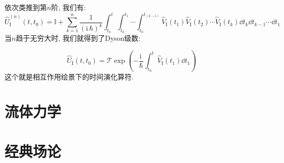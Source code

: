 依次类推到第$n$阶, 我们有:
\begin{equation}
  \hat{U}_{\text{I}}^{(n)}(t,t_0) = \mathbb{I} + \sum_{k=1}^{n} \frac{1}{(\mathrm{i}\,\hbar)^k} \int_{t_0}^{t} \int_{t_0}^{t_1} \cdots \int_{t_0}^{t_{(k-1)}} \hat{V}_{\text{I}}(t_1) \hat{V}_{\text{I}}(t_2) \cdots \hat{V}_{\text{I}}(t_k) \dd{t_k} \dd{t_{k-1}} \cdots \dd{t_1}
\end{equation}
当$n$趋于无穷大时, 我们就得到了Dyson级数:
\begin{fancybox}
\begin{equation}
  \hat{U}_{\text{I}}(t,t_0) = \mathcal{T} \exp\left( -\frac{\mathrm{i}\,}{\hbar} \int_{t_0}^{t} \hat{V}_{\text{I}}(t_1) \dd{t_1} \right)
\end{equation}
这个就是相互作用绘景下的时间演化算符.
\end{fancybox}


\section{流体力学}
\label{CH1 S5 Fluid mechanics}



\section{经典场论}
\label{CH1 S6 Classical field theory}









